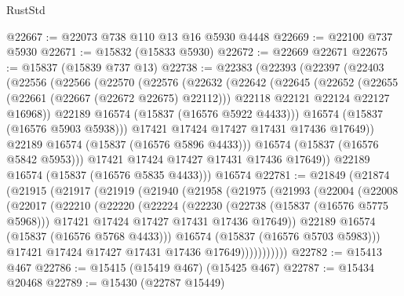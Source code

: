 \begin{lexlean}{RustStd}
\begin{coremodule}
{\begin{coremodule}
{{{{{{{{{{{{{{{{{{{{{{{{{{{{{{{{{{{{{{{{{{{{{{{{{{{{{{{{{{{{@22667 := @22073 @738 @110 @13 @16 @5930 @4448
@22669 := @22100 @737 @5930
@22671 := @15832 (@15833 @5930)
@22672 := @22669 @22671
@22675 := @15837 (@15839 @737 @13)
@22738 := @22383
    (@22393
      (@22397
        (@22403
          (@22556
            (@22566
              (@22570
                (@22576
                  (@22632
                    (@22642
                      (@22645
                        (@22652
                          (@22655 (@22661 (@22667 (@22672 @22675) @22112)))
                          @22118
                          @22121
                          @22124
                          @22127
                          @16968))
                      @22189
                      @16574
                      (@15837 (@16576 @5922 @4433)))
                    @16574
                    (@15837 (@16576 @5903 @5938)))
                  @17421
                  @17424
                  @17427
                  @17431
                  @17436
                  @17649))
              @22189
              @16574
              (@15837 (@16576 @5896 @4433)))
            @16574
            (@15837 (@16576 @5842 @5953)))
          @17421
          @17424
          @17427
          @17431
          @17436
          @17649))
      @22189
      @16574
      (@15837 (@16576 @5835 @4433)))
    @16574
@22781 := @21849
    (@21874
      (@21915
        (@21917
          (@21919
            (@21940
              (@21958
                (@21975
                  (@21993
                    (@22004
                      (@22008
                        (@22017
                          (@22210
                            (@22220
                              (@22224
                                (@22230
                                  (@22738 (@15837 (@16576 @5775 @5968)))
                                  @17421
                                  @17424
                                  @17427
                                  @17431
                                  @17436
                                  @17649))
                              @22189
                              @16574
                              (@15837 (@16576 @5768 @4433)))
                            @16574
                            (@15837 (@16576 @5703 @5983)))
                          @17421
                          @17424
                          @17427
                          @17431
                          @17436
                          @17649)))))))))))
@22782 := @15413 @467
@22786 := @15415 (@15419 @467) (@15425 @467)
@22787 := @15434 @20468
@22789 := @15430 (@22787 @15449)
}}}}}}}}}}}}}}}}}}}}}}}}}}}}}}}}}}}}}}}}}}}}}}}}}}}}}}}}}}}}
\end{coremodule}}
\end{coremodule}
\end{lexlean}
